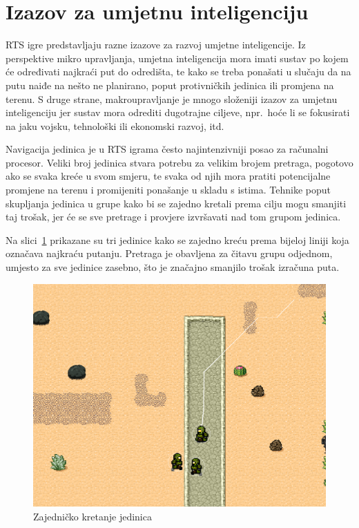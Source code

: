 \documentclass[times, utf8, zavrsni, numeric]{fer}
\begin{document}
\section{Izazov za umjetnu inteligenciju}

\par RTS igre predstavljaju razne izazove za razvoj umjetne inteligencije. 
Iz perspektive mikro upravljanja, umjetna inteligencija mora imati sustav po kojem će određivati najkraći put do odredišta, te kako se treba ponašati u slučaju da na putu naiđe na nešto ne planirano, poput protivničkih jedinica ili promjena na terenu. 
S druge strane, makroupravljanje je mnogo složeniji izazov za umjetnu inteligenciju jer sustav mora odrediti dugotrajne ciljeve, npr.\ hoće li se fokusirati na jaku vojsku, tehnološki ili ekonomski razvoj, itd.

\par Navigacija jedinica je u RTS igrama često najintenzivniji posao za računalni procesor.
Veliki broj jedinica stvara potrebu za velikim brojem pretraga, pogotovo ako se svaka kreće u svom smjeru, te svaka od njih mora pratiti potencijalne promjene na terenu i promijeniti ponašanje u skladu s istima.
Tehnike poput skupljanja jedinica u grupe kako bi se zajedno kretali prema cilju mogu smanjiti taj trošak, jer će se sve pretrage i provjere izvršavati nad tom grupom jedinica\cite{book:AIGameProgrammingWisdom}. 

\par Na slici~\ref{fig:RTSgrouping} prikazane su tri jedinice kako se zajedno kreću prema bijeloj liniji koja označava najkraću putanju.
Pretraga je obavljena za čitavu grupu odjednom, umjesto za sve jedinice zasebno, što je značajno smanjilo trošak izračuna puta.

\begin{figure}[h] 
	\centering
	\includegraphics[width=0.6\linewidth]{images/RTSgrouping.png}
	\caption{Zajedničko kretanje jedinica}
	\label{fig:RTSgrouping}
\end{figure} 
\end{document}

